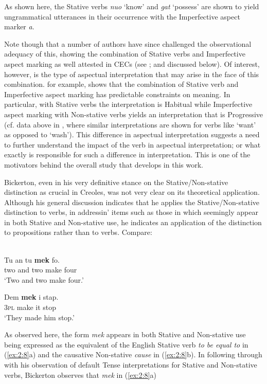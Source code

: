 As shown here, the Stative verbs \textit{nuo} `know' and \textit{gat}
`possess' are shown to yield ungrammatical utterances in their
occurrence with the Imperfective aspect marker \textit{a}.

Note though that a number of authors have since challenged the
observational adequacy of this, showing the combination of Stative
verbs and Imperfective aspect marking as well attested in CECs (see
\citealt{Jaganauth1987}; and \citealt{Sidnell2002} discussed below).  Of
interest, however, is the type of aspectual interpretation that may
arise in the face of this combination.  \citet{Sidnell2002} for
example, shows that the combination of Stative verb and Imperfective
aspect marking has predictable constraints on meaning.  In particular,
with Stative verbs the interpretation is Habitual while Imperfective
aspect marking with Non-stative verbs yields an interpretation that is
Progressive (cf. data above in \citet{Voorhoeve1957}, where similar
interpretations are shown for verbs like `want' as opposed to `wash').
This difference in aspectual interpretation suggests a need to further
understand the impact of the verb in aspectual interpretation; or what
exactly is responsible for such a difference in interpretation. This
is one of the motivators behind the overall study that develops in
this work.

Bickerton, even in his very definitive stance on the
Stative\slash Non-stative distinction as crucial in Creoles, was not very
clear on its theoretical application.  Although his general discussion
indicates that he applies the Stative\slash Non-stative distinction to
verbs, in addressin' items such as those in  which
seemingly appear in both Stative and Non-stative use, he indicates an
application of the distinction to propositions rather than to verbs.
Compare:

\ea%
\label{ex:2:8}
\citet[30]{Bickerton1975}\\
\ea
\gll Tu an tu \textbf{mek} fo.\\
     two and two make four \\
\glt `Two and two make four.'

\ex
\gll Dem \textbf{mek} i stap.\\
     \textsc{3pl} make it stop\\
\glt `They made him stop.'\z \z

As observed here, the form \textit{mek} appears in both Stative and
Non-stative use being expressed as the equivalent of the English
Stative verb \textit{to be equal to} in (\ref{ex:2:8}a) and the causative
Non-stative \textit{cause} in (\ref{ex:2:8}b).  In following through with his
observation of default Tense interpretations for Stative and
Non-stative verbs, Bickerton observes that \textit{mek} in
(\ref{ex:2:8}a)

